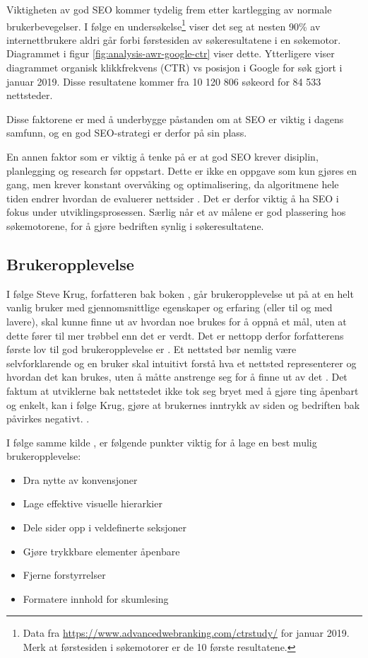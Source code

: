 Viktigheten av god SEO kommer tydelig frem etter kartlegging av normale brukerbevegelser. I følge en undersøkelse\footnote{Data fra \url{https://www.advancedwebranking.com/ctrstudy/} for januar 2019. Merk at førstesiden i søkemotorer er de 10 første resultatene.} viser det seg at nesten 90\% av internettbrukere aldri går forbi førstesiden av søkeresultatene i en søkemotor. Diagrammet i figur \ref{fig:analysis-awr-google-ctr} viser dette. Ytterligere viser diagrammet organisk klikkfrekvens (CTR) vs posisjon i Google for søk gjort i januar 2019. Disse resultatene kommer fra 10 120 806 søkeord for 84 533 nettsteder.

Disse faktorene er med å underbygge påstanden om at SEO er viktig i dagens samfunn, og en god SEO-strategi er derfor på sin plass. 

En annen faktor som er viktig å tenke på er at god SEO krever disiplin, planlegging og research før oppstart. Dette er ikke en oppgave som kun gjøres en gang, men krever konstant overvåking og optimalisering, da algoritmene hele tiden endrer hvordan de evaluerer nettsider \cite[s.~1]{mitchell2012usb}. Det er derfor viktig å ha SEO i fokus under utviklingsprosessen. Særlig når et av målene er god plassering hos søkemotorene, for å gjøre bedriften synlig i søkeresultatene.

\subsection{Brukeropplevelse}
\label{sec:ux}
I følge Steve Krug, forfatteren bak boken , går brukeropplevelse ut på at en helt vanlig bruker med gjennomsnittlige egenskaper og erfaring (eller til og med lavere), skal kunne finne ut av hvordan noe brukes for å oppnå et mål, uten at dette fører til mer trøbbel enn det er verdt.
Det er nettopp derfor forfatterens første lov til god brukeropplevelse er . Et nettsted bør nemlig være selvforklarende og en bruker skal intuitivt forstå hva et nettsted representerer og hvordan det kan brukes, uten å måtte anstrenge seg for å finne ut av det \cite[s.~11]{krug2014dmt}. Det faktum at utviklerne bak nettstedet ikke tok seg bryet med å gjøre ting åpenbart og enkelt, kan i følge Krug, gjøre at brukernes inntrykk av siden og bedriften bak påvirkes negativt.
\cite[s.~15]{krug2014dmt}.

I følge samme kilde \cite[s.~29]{krug2014dmt}, er følgende punkter viktig for å lage en best mulig brukeropplevelse:
\begin{itemize}
    \item Dra nytte av konvensjoner
    \item Lage effektive visuelle hierarkier
    \item Dele sider opp i veldefinerte seksjoner
    \item Gjøre trykkbare elementer åpenbare
    \item Fjerne forstyrrelser
    \item Formatere innhold for skumlesing
\end{itemize}

